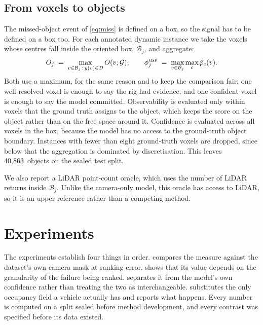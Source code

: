 \documentclass[10pt,twocolumn,letterpaper]{article}
\newcommand{\nObj}{40{,}863}
\begin{document}
\subsection{From voxels to objects}
\label{sec:agg}
The missed-object event of \cref{eq:miss} is defined on a box, so the
signal has to be defined on a box too. For each annotated dynamic instance
we take the voxels whose centres fall inside the oriented box,
$\mathcal{B}_j$, and aggregate:
\begin{equation}
O_j \;=\; \max_{v \in \mathcal{B}_j \,:\, y(v)\in\mathcal{D}} O(v;\mathcal{G}),
\qquad
\phi^{\textsc{msp}}_j \;=\; \max_{v \in \mathcal{B}_j} \max_c \hat{p}_c(v).
\label{eq:agg}
\end{equation}
Both use a maximum, for the same reason and to keep the comparison fair:
one well-resolved voxel is enough to say the rig had evidence, and one
confident voxel is enough to say the model committed. Observability is evaluated only within voxels that the ground truth
assigns to the object, which keeps the score on the object rather than on
the free space around it. Confidence is evaluated across all voxels in the
box, because the model has no access to the ground-truth object boundary.
Instances with fewer than eight ground-truth voxels are dropped, since
below that the aggregation is dominated by discretisation. This leaves
\nObj\ objects on the sealed test split.

We also report a LiDAR point-count oracle, which uses the number of LiDAR
returns inside $\mathcal{B}_j$. Unlike the camera-only model, this oracle
has access to LiDAR, so it is an upper reference rather than a competing
method.


\section{Experiments}

The experiments establish four things in order.  compares the
measure against the dataset's own camera mask at ranking error.
 shows that its value depends on the granularity of the
failure being ranked.  separates it from the model's own
confidence rather than treating the two as interchangeable.
 substitutes the only occupancy field a vehicle
actually has and reports what happens. Every number is computed on a split
sealed before method development, and every contrast was specified before
its data existed.
\end{document}
